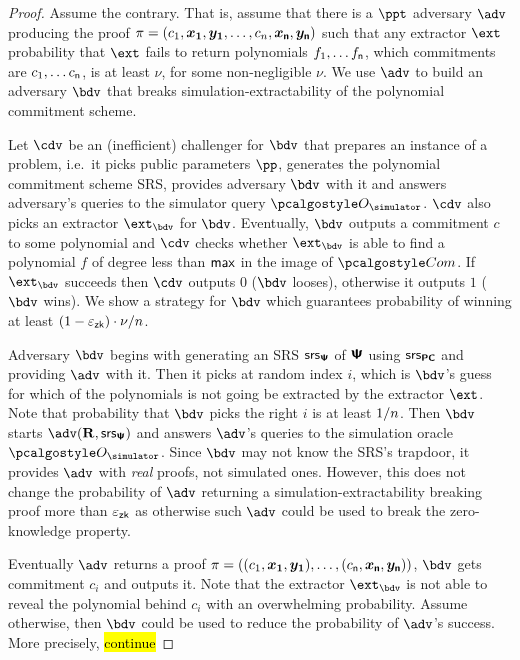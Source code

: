 \documentclass[runningheads,11pt]{llncs}
\begin{document}
\begin{proof}
  Assume the contrary. That is, assume that there is a $\ppt$ adversary $\adv$
  producing the proof
  $\zkproof = (c_1, \vec{x_1}, \vec{y_1}, \ldots, c_n, \vec{x_\plen}, \vec{y_\plen})$
   such that any
  extractor $\ext$ probability that $\ext$ fails to return polynomials
  $f_1, \ldots f_{\mathsf{n}}$, which commitments are $c_1, \ldots c_{\mathsf{n}}$, is at least $\nu$,
  for some non-negligible $\nu$. We use $\adv$ to build an adversary $\bdv$ that
  breaks simulation-extractability of the polynomial commitment scheme.

  Let $\cdv$ be an (inefficient) challenger for $\bdv$ that prepares an instance
  of a problem, i.e.~it picks public parameters $\pp$, generates the polynomial
  commitment scheme SRS, provides adversary $\bdv$ with it and answers
  adversary's queries to the simulator query $\oracles$. $\cdv$ also picks an
  extractor $\ext_\bdv$ for $\bdv$. Eventually, $\bdv$ outputs a commitment $c$
  to some polynomial and $\cdv$ checks whether $\ext_\bdv$ is able to find a
  polynomial $f$ of degree less than $\mathsf{max}$ in the image of $\com$. If
  $\ext_\bdv$ succeeds then $\cdv$ outputs $0$ ($\bdv$ looses), otherwise it
  outputs $1$ ($\bdv$ wins). We show a strategy for $\bdv$ which guarantees
  probability of winning at least $(1 - \varepsilon_{\mathsf{zk}}) \cdot \nu / n$.

  Adversary $\bdv$ begins with generating an SRS $\mathsf{srs}_{\bm{\mathsf{\Psi}}}$ of $\bm{\mathsf{\Psi}}$ using
  $\mathsf{srs}_{\bm{\mathsf{PC}}}$  and providing $\adv$ with it. Then it
  picks at random index $i$, which is $\bdv$'s guess for which of the
  polynomials is not going be extracted by the extractor $\ext$. Note that
  probability that $\bdv$ picks the right $i$ is at least $1 / n$.  Then
  $\bdv$ starts $\adv(\REL, \srs_{\PS})$ and answers $\adv$'s queries to the
  simulation oracle $\oracles$. Since $\bdv$ may not know the SRS's trapdoor, it
  provides $\adv$ with \emph{real} proofs, not simulated ones. However, this
  does not change the probability of $\adv$ returning a
  simulation-extractability breaking proof more than $\varepsilon_{\mathsf{zk}}$ as otherwise such
  $\adv$ could be used to break the zero-knowledge property.

  Eventually $\adv$ returns a proof $\zkproof = ((c_1, \vec{x_1}, \vec{y_1}),
  \ldots, (c_\plen, \vec{x_\plen}, \vec{y_\plen}))$, $\bdv$ gets commitment
  $c_i$ and outputs it.  Note that the extractor $\ext_\bdv$ is not able to
reveal the polynomial behind $c_i$ with an overwhelming probability. Assume
otherwise, then $\bdv$ could be used to reduce the probability of $\adv$'s
success. More precisely, \hl{continue}

\end{proof}
\end{document}
